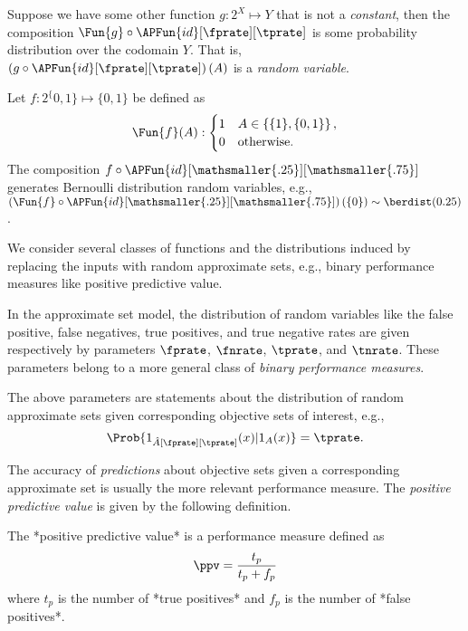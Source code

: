 \documentclass[
]{article}
\begin{document}
Suppose we have some other function \(g : 2^X \mapsto Y\) that is not a
\emph{constant}, then the composition
\(\Fun{g} \circ \APFun{id}[\fprate][\tprate]\) is some probability
distribution over the codomain \(Y\). That is,
\(\left(g \circ \APFun{id}[\fprate][\tprate]\right)(A)\) is a
\emph{random variable}.

\begin{example}
    Let $f : 2^\{0,1\} \mapsto \{0,1\}$ be defined as
    \begin{equation}
    \Fun{f}(A) :
    \begin{cases}
    1 & A \in \left\{\{1\},\{0,1\}\right\},\\
    0 & \text{otherwise.}
    \end{cases}
    \end{equation}
    The composition $f \circ \APFun{id}[\mathsmaller{.25}][\mathsmaller{.75}]$ generates Bernoulli distribution random variables, e.g., $\left(\Fun{f} \circ \APFun{id}[\mathsmaller{.25}][\mathsmaller{.75}]\right)(\{0\}) \sim \berdist(0.25)$.
\end{example}

We consider several classes of functions and the distributions induced
by replacing the inputs with random approximate sets, e.g., binary
performance measures like positive predictive value.

In the approximate set model, the distribution of random variables like
the false positive, false negatives, true positives, and true negative
rates are given respectively by parameters \(\fprate\), \(\fnrate\),
\(\tprate\), and \(\tnrate\). These parameters belong to a more general
class of \emph{binary performance measures}.

The above parameters are statements about the distribution of random
approximate sets given corresponding objective sets of interest, e.g.,
\begin{equation}
\Prob{1_{\hat A[\fprate][\tprate]}(x) | 
    1_{A}(x)} = \tprate.
\end{equation}

The accuracy of \emph{predictions} about objective sets given a
corresponding approximate set is usually the more relevant performance
measure. The \emph{positive predictive value} is given by the following
definition.

\begin{definition}
    The *positive predictive value* is a performance measure defined as
    \begin{equation}
    \ppv = \frac{t_p}{t_p + f_p}
    \end{equation}
    where $t_p$ is the number of *true positives* and $f_p$ is the number of *false positives*.
\end{definition}
\end{document}
